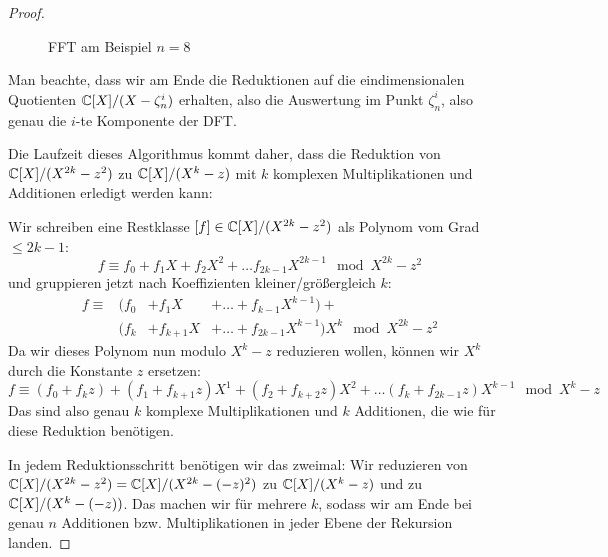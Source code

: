 \begin{proof}
\begin{figure}[htp]
        \caption{FFT am Beispiel $n=8$}
        \label{fig:fft:example_n_equals_8}
    \end{figure}

    Man beachte, dass wir am Ende die Reduktionen auf die eindimensionalen Quotienten $\mathbb{C}[X]/(X - \zeta_n^i)$ erhalten, also die Auswertung im Punkt $\zeta_n^i$, also genau die $i$-te Komponente der DFT\@.

    \medskip
    Die Laufzeit dieses Algorithmus kommt daher, dass die Reduktion von $\mathbb{C}[X]/(X^{2k}-z^2)$ zu $\mathbb{C}[X]/(X^k-z)$ mit $k$ komplexen Multiplikationen und Additionen erledigt werden kann:

    Wir schreiben eine Restklasse $[f] \in \mathbb{C}[X]/(X^{2k}-z^2)$ als Polynom vom Grad $\leq 2k-1$:
    \[f \equiv f_0 + f_1 X + f_2 X^2 + \ldots f_{2k-1}X^{2k-1} \mod X^{2k}-z^2\]
    und gruppieren jetzt nach Koeffizienten kleiner/größergleich $k$:
    \begin{align*}
        f \equiv & (f_0     &+ f_1 X      &+ \ldots + f_{k-1}X^{k-1}) + \\
        & (f_k &+ f_{k+1}X &+ \ldots + f_{2k-1}X^{k-1})X^k \mod X^{2k}-z^2
    \end{align*}
    Da wir dieses Polynom nun modulo $X^k-z$ reduzieren wollen, können wir $X^k$ durch die Konstante $z$ ersetzen:
    \[f \equiv (f_0+f_k z) + (f_1+f_{k+1}z)X^1+(f_2+f_{k+2}z)X^2 + \ldots (f_{k}+f_{2k-1}z)X^{k-1} \mod X^k-z\]
    Das sind also genau $k$ komplexe Multiplikationen und $k$ Additionen, die wie für diese Reduktion benötigen.

    \medskip
    In jedem Reduktionsschritt benötigen wir das zweimal: Wir reduzieren von $\mathbb{C}[X]/(X^{2k}-z^2) = \mathbb{C}[X]/(X^{2k}-(-z)^2)$ zu $\mathbb{C}[X]/(X^k-z)$ und zu $\mathbb{C}[X]/(X^k-(-z))$.
    Das machen wir für mehrere $k$, sodass wir am Ende bei genau $n$ Additionen bzw. Multiplikationen in jeder Ebene der Rekursion landen.


\end{proof}
